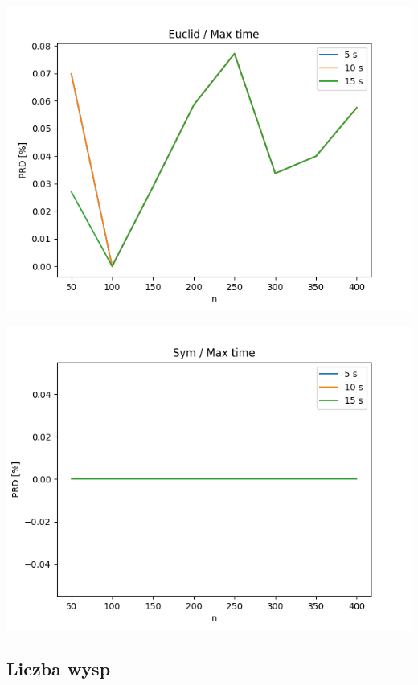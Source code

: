 \documentclass{article}
\begin{document}
\begin{center}
\includegraphics[width=\textwidth, 
                   height = 0.4\textheight, 
                   keepaspectratio]
                  {plots/euclid_9_max_time} 
\end{center}

\begin{center}
\includegraphics[width=\textwidth, 
                   height = 0.4\textheight, 
                   keepaspectratio]
                  {plots/sym_9_max_time} 
\end{center}


\subsection{Liczba wysp}
\end{document}
